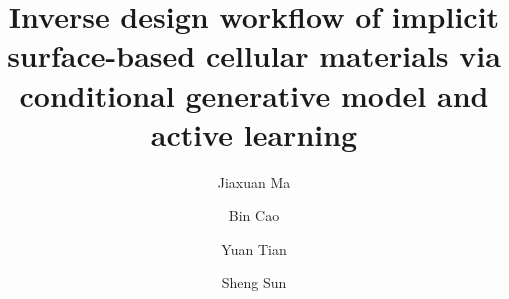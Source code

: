 \documentclass[preprint,review,12pt,authoryear]{elsarticle}
\begin{document}


\begin{frontmatter}



\title{Inverse design workflow of implicit surface-based cellular materials via conditional generative model and active learning}


\author[1]{Jiaxuan Ma}
\author[3]{Bin Cao}
\author[1]{Yuan Tian}
\author[1,2]{Sheng Sun}


\address[1]{Materials Genome Institute, Shanghai University, Shanghai, 200444, China}
\address[2]{Shanghai Frontier Science Center of Mechanoinformatics, Shanghai University, Shanghai, 200444, China}
\address[3]{Advanced Materials Thrust, Hong Kong University of Science and Technology (Guangzhou), Guangzhou, 511400, Guangdong, China}



\end{frontmatter}
\end{document}
